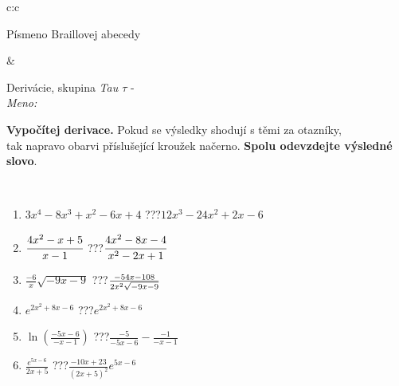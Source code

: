 \documentclass[10pt]{report}
\begin{document}
\begin{tabular}{c:c}
\begin{minipage}[c][104.5mm][t]{0.5\linewidth}
\begin{center}
\begin{minipage}{0.20\linewidth}
\begin{center}
{\small Písmeno Braillovej abecedy}
\end{center}
\end{minipage}
\end{center}
\end{minipage}
&
\begin{minipage}[c][104.5mm][t]{0.5\linewidth}
\begin{center}
\vspace{7mm}
{\huge Derivácie, skupina \textit{Tau $\tau$} -}\\[5mm]
\textit{Meno:}\phantom{xxxxxxxxxxxxxxxxxxxxxxxxxxxxxxxxxxxxxxxxxxxxxxxxxxxxxxxxxxxxxxxxx}\\[5mm]
\begin{minipage}{0.95\linewidth}
\begin{center}
\textbf{Vypočítej derivace.} Pokud se výsledky shodují s těmi za otazníky,\\tak napravo obarvi příslušející kroužek načerno. \textbf{Spolu odevzdejte výsledné slovo}.
\end{center}
\end{minipage}
\\[1mm]
\begin{minipage}{0.79\linewidth}
\begin{center}
\begin{varwidth}{\linewidth}
\begin{enumerate}
\normalsize
\item $3x^4-8x^3+x^2-6x+4$\quad \dotfill\; ???\;\dotfill \quad $12x^3-24x^2+2x-6$
\item $\cfrac{4x^2-x+5}{x-1}$\quad \dotfill\; ???\;\dotfill \quad $\cfrac{4x^2-8x-4}{x^2-2x+1}$
\item $\frac{-6}{x}\sqrt{-9x-9}$\quad \dotfill\; ???\;\dotfill \quad $\frac{-54x-108}{2x^2 \sqrt{\smash[b]{-9x-9}}}$
\item $e^{2x^2+8x-6}$\quad \dotfill\; ???\;\dotfill \quad $e^{2x^2+8x-6}$
\item $\ln{\left(\frac{-5x-6}{-x-1}\right)}$\quad \dotfill\; ???\;\dotfill \quad $\frac{-5}{-5x-6}-\frac{-1}{-x-1}$
\item $\frac{e^{5x-6}}{2x+5}$\quad \dotfill\; ???\;\dotfill \quad $\frac{-10x+23}{(2x+5)^2}e^{5x-6}$
\end{enumerate}
\end{varwidth}
\end{center}
\end{minipage}
\begin{minipage}{0.20\linewidth}
\begin{center}

\end{center}
\end{minipage}
\end{center}
\end{minipage}
\end{tabular}
\end{document}
